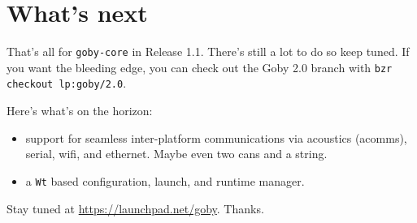\chapter{What's next}

That's all for \verb|goby-core| in Release 1.1. There's still a lot to do so keep tuned. If you want the bleeding edge, you can check out the Goby 2.0 branch with 
\verb|bzr checkout lp:goby/2.0|.

Here's what's on the horizon:
\begin{itemize}
\item support for seamless inter-platform communications via acoustics (acomms), serial, wifi, and ethernet. Maybe even two cans and a string.
\item a \verb|Wt| \cite{wt} based configuration, launch, and runtime manager.
\end{itemize}

Stay tuned at \url{https://launchpad.net/goby}. Thanks.

